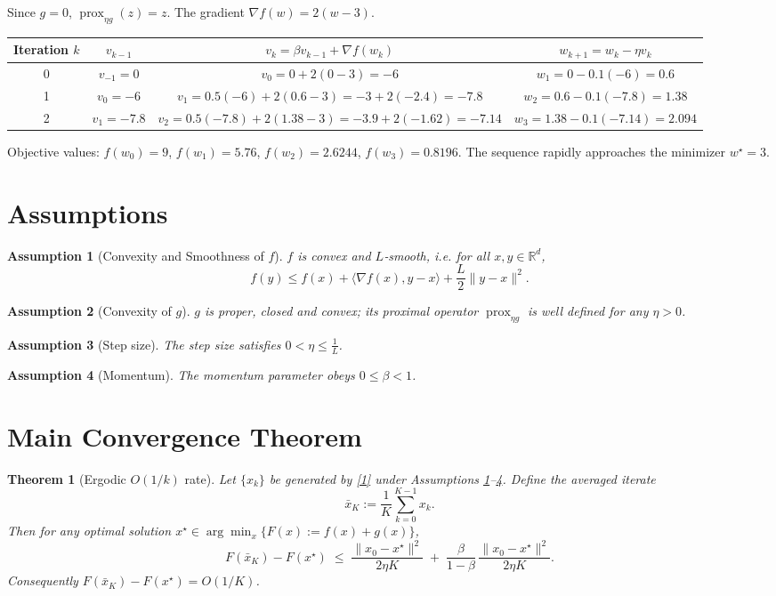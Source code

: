 \documentclass{article}
\newtheorem{theorem}{Theorem}
\newtheorem{assumption}{Assumption}
\newcommand{\prox}{\operatorname{prox}}
\newcommand{\grad}{\nabla}
\newcommand{\R}{\mathbb{R}}
\begin{document}
Since $g=0$, $\prox_{\eta g}(z)=z$.  The gradient $\grad f(w)=2(w-3)$.  

\begin{center}
\begin{tabular}{c|c|c|c}
Iteration $k$ & $v_{k-1}$ & $v_k=\beta v_{k-1}+ \grad f(w_k)$ & $w_{k+1}=w_k-\eta v_k$\\ \hline
0 & $v_{-1}=0$ & $v_0=0+2(0-3)=-6$ & $w_1=0-0.1(-6)=0.6$\\
1 & $v_{0}=-6$ & $v_1=0.5(-6)+2(0.6-3)= -3+2(-2.4) = -7.8$ & $w_2=0.6-0.1(-7.8)=1.38$\\
2 & $v_{1}=-7.8$ & $v_2=0.5(-7.8)+2(1.38-3)= -3.9+2(-1.62)= -7.14$ & $w_3=1.38-0.1(-7.14)=2.094$\\
\end{tabular}
\end{center}

Objective values: $f(w_0)=9$, $f(w_1)=5.76$, $f(w_2)=2.6244$, $f(w_3)=0.8196$.  
The sequence rapidly approaches the minimizer $w^\star=3$.

\section*{Assumptions}
\begin{assumption}[Convexity and Smoothness of $f$]\label{assump:f}
$f$ is convex and $L$‑smooth, i.e. for all $x,y\in\R^{d}$,
\[
f(y)\le f(x)+\langle\grad f(x),y-x\rangle+\frac{L}{2}\|y-x\|^{2}.
\tag{2}
\]
\end{assumption}
\begin{assumption}[Convexity of $g$]\label{assump:g}
$g$ is proper, closed and convex; its proximal operator $\prox_{\eta g}$ is well defined for any $\eta>0$.
\end{assumption}
\begin{assumption}[Step size]\label{assump:eta}
The step size satisfies $0<\eta\le \frac{1}{L}$.
\end{assumption}
\begin{assumption}[Momentum]\label{assump:beta}
The momentum parameter obeys $0\le\beta<1$.
\end{assumption}

\section*{Main Convergence Theorem}
\begin{theorem}[Ergodic $O(1/k)$ rate]\label{thm:rate}
Let $\{x_k\}$ be generated by \eqref{1} under Assumptions \ref{assump:f}–\ref{assump:beta}.  
Define the averaged iterate
\[
\bar{x}_K:=\frac{1}{K}\sum_{k=0}^{K-1}x_k.
\]
Then for any optimal solution $x^\star\in\arg\min_{x}\{F(x):=f(x)+g(x)\}$,
\[
F(\bar{x}_K)-F(x^\star)\;\le\;
\frac{\|x_0-x^\star\|^{2}}{2\eta K}\;+\;\frac{\beta}{1-\beta}\,\frac{\|x_0-x^\star\|^{2}}{2\eta K}.
\tag{3}
\]
Consequently $F(\bar{x}_K)-F(x^\star)=O(1/K)$.
\end{theorem}
\end{document}
